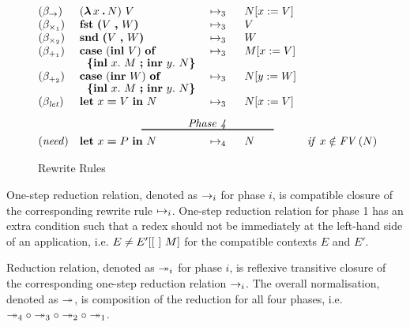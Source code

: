 \begin{figure*}[h]
\[\begin{array}[t]{@{}lllll@{}}


(\beta_{\rightarrow})
& \expapp{(\expabs{x}{A}{N})}{V}
& \ \rewrite{}{3}{}\ \
& \sbs{N}{x}{V}
& \\[0pt]

(\beta_{\times_1})
& \expfst{\expprd{V}{W}}
& \ \rewrite{}{3}{}\ \
& V
& \\[0pt]

(\beta_{\times_2})
& \expsnd{\expprd{V}{W}}
& \ \rewrite{}{3}{}\ \
& W
& \\[0pt]

(\beta_{+_1})
& \expcasind{(\explft{V}{B})}{x}{M}{y}{N}
& \ \rewrite{}{3}{}\ \
& \sbs{M}{x}{V}
& \\[0pt]

(\beta_{+_2})
& \expcasind{(\exprgt{A}{W})}{x}{M}{y}{N}
& \ \rewrite{}{3}{}\ \
& \sbs{N}{y}{W}
& \\[0pt]

(\beta_{\txt{let}})
& \expshr{x}{V}{N}
& \ \rewrite{}{3}{}\ \
& \sbs{N}{x}{V}
& \\[8pt]

\multicolumn{5}{@{}c@{}}{\txt{Phase 4}}\\[-9pt]
\multicolumn{5}{@{}c@{}}{\rule{120pt}{1pt}}\\[1pt]

(\txt{need})
& \expshr{x}{\nv}{N}
& \ \rewrite{}{4}{}\ \
& N %
& \cnd{%
       x \notin \fv{N}}\\[0pt]
\end{array}
\]
\caption{Rewrite Rules}
\label{fig:red}
\end{figure*}

One-step reduction relation, denoted as $\rightarrow_{i}$ for phase
$i$, is compatible closure of the corresponding rewrite rule
$\mapsto_{i}$. One-step reduction relation for phase 1 has an
extra condition such that a redex should not be immediately at the
left-hand side of an application, i.e. $E \neq
{E}'[[\ ]\ M]$ for the compatible contexts $E$ and $E'$.

Reduction relation, denoted as $\twoheadrightarrow_{i}$ for phase $i$, is
reflexive transitive closure of the corresponding one-step reduction
relation $\rightarrow_{i}$. The overall normalisation, denoted as
$\twoheadrightarrow_{}$, is composition of the reduction for all four
phases,
i.e. $\twoheadrightarrow_{4}\circ\twoheadrightarrow_{3}\circ\twoheadrightarrow_{2}\circ\twoheadrightarrow_{1}$.

